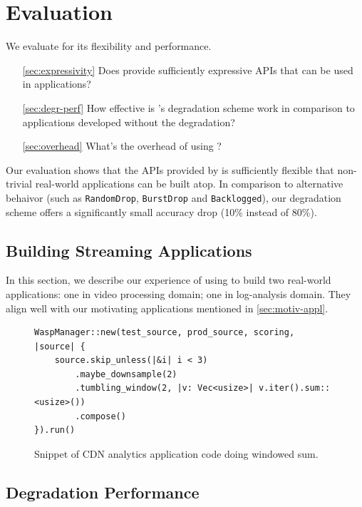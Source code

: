 \section{Evaluation}
\label{sec:evaluation}

We evaluate \sysname{} for its flexibility and performance.

\begin{itemize}[leftmargin=30pt]
\item[\autoref{sec:expressivity}] Does \sysname{} provide sufficiently expressive
  APIs that can be used in applications?
\item[\autoref{sec:degr-perf}] How effective is \sysname{}'s degradation scheme
  work in comparison to applications developed without the degradation?
\item[\autoref{sec:overhead}] What's the overhead of using \sysname{}?
\end{itemize}

Our evaluation shows that the APIs provided by \sysname{} is sufficiently
flexible that non-trivial real-world applications can be built atop. In
comparison to alternative behaivor (such as \texttt{RandomDrop},
\texttt{BurstDrop} and \texttt{Backlogged}), our degradation scheme offers a
significantly small accuracy drop (10\% instead of 80\%).

\subsection{Building Streaming Applications}
\label{sec:expressivity}

In this section, we describe our experience of using \sysname{} to build two
real-world applications: one in video processing domain; one in log-analysis
domain. They align well with our motivating applications mentioned in \autoref{sec:motiv-appl}.

\begin{figure}
  \begin{lstlisting}
WaspManager::new(test_source, prod_source, scoring, |source| {
    source.skip_unless(|&i| i < 3)
        .maybe_downsample(2)
        .tumbling_window(2, |v: Vec<usize>| v.iter().sum::<usize>())
        .compose()
}).run()
  \end{lstlisting}
  \caption{Snippet of CDN analytics application code doing windowed sum.}
  \label{fig:cdn-code}
\end{figure}

\subsection{Degradation Performance}
\label{sec:degr-perf}

